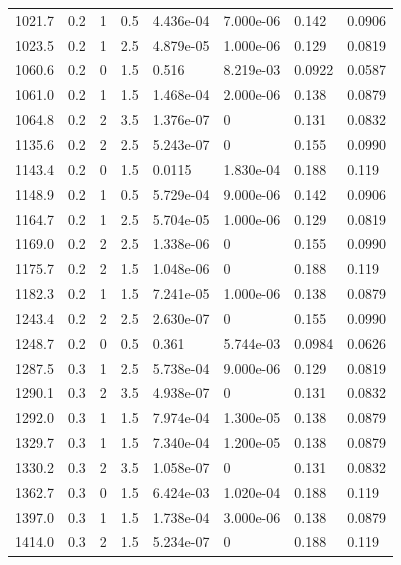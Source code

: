 \documentclass[preview]{standalone}
\begin{document}
{{{\begin{tabular}{L{1.2cm}C{1.2cm} C{0.3cm}C{0.5cm} C{1.4cm}C{1.4cm} C{1.4cm}C{1.4cm}}
  1021.7  &   0.2  & 1     & 0.5 &  4.436e-04  & 7.000e-06  & 0.142 &  0.0906   \\ 
  1023.5  &   0.2  & 1     & 2.5 &  4.879e-05  & 1.000e-06  & 0.129 &  0.0819   \\ 
  1060.6  &   0.2  & 0     & 1.5 &  0.516  & 8.219e-03  & 0.0922 &  0.0587   \\ 
  1061.0  &   0.2  & 1     & 1.5 &  1.468e-04  & 2.000e-06  & 0.138 &  0.0879   \\ 
  1064.8  &   0.2  & 2     & 3.5 &  1.376e-07  & 0  & 0.131 &  0.0832   \\ 
  1135.6  &   0.2  & 2     & 2.5 &  5.243e-07  & 0  & 0.155 &  0.0990   \\ 
  1143.4  &   0.2  & 0     & 1.5 &  0.0115  & 1.830e-04  & 0.188 &  0.119   \\ 
  1148.9  &   0.2  & 1     & 0.5 &  5.729e-04  & 9.000e-06  & 0.142 &  0.0906   \\ 
  1164.7  &   0.2  & 1     & 2.5 &  5.704e-05  & 1.000e-06  & 0.129 &  0.0819   \\ 
  1169.0  &   0.2  & 2     & 2.5 &  1.338e-06  & 0  & 0.155 &  0.0990   \\ 
  1175.7  &   0.2  & 2     & 1.5 &  1.048e-06  & 0  & 0.188 &  0.119   \\ 
  1182.3  &   0.2  & 1     & 1.5 &  7.241e-05  & 1.000e-06  & 0.138 &  0.0879   \\ 
  1243.4  &   0.2  & 2     & 2.5 &  2.630e-07  & 0  & 0.155 &  0.0990   \\ 
  1248.7  &   0.2  & 0     & 0.5 &  0.361  & 5.744e-03  & 0.0984 &  0.0626   \\ 
  1287.5  &   0.3  & 1     & 2.5 &  5.738e-04  & 9.000e-06  & 0.129 &  0.0819   \\ 
  1290.1  &   0.3  & 2     & 3.5 &  4.938e-07  & 0  & 0.131 &  0.0832   \\ 
  1292.0  &   0.3  & 1     & 1.5 &  7.974e-04  & 1.300e-05  & 0.138 &  0.0879   \\ 
  1329.7  &   0.3  & 1     & 1.5 &  7.340e-04  & 1.200e-05  & 0.138 &  0.0879   \\ 
  1330.2  &   0.3  & 2     & 3.5 &  1.058e-07  & 0  & 0.131 &  0.0832   \\ 
  1362.7  &   0.3  & 0     & 1.5 &  6.424e-03  & 1.020e-04  & 0.188 &  0.119   \\ 
  1397.0  &   0.3  & 1     & 1.5 &  1.738e-04  & 3.000e-06  & 0.138 &  0.0879   \\ 
  1414.0  &   0.3  & 2     & 1.5 &  5.234e-07  & 0  & 0.188 &  0.119   \\ 

\end{tabular}}}}
\end{document}
